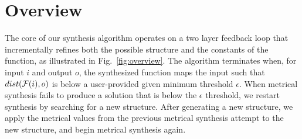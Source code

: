 \section{Overview}

The core of our synthesis algorithm operates on a two layer feedback loop that incrementally refines both the possible structure and the constants of the function, as illustrated in Fig.~\ref{fig:overview}.
The algorithm terminates when, for input $i$ and output $o$, the synthesized function maps the input such that $dist(\mathcal{F}(i),o)$ is below a user-provided given minimum threshold $\epsilon$.
When metrical synthesis fails to produce a solution that is below the $\epsilon$ threshold, we restart synthesis by searching for a new structure.
After generating a new structure, we apply the metrical values from the previous metrical synthesis attempt to the new structure, and begin metrical synthesis again.



